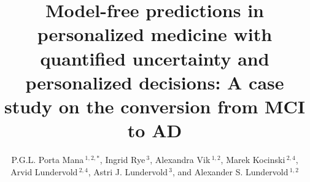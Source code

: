 \documentclass[utf8]{FrontiersinHarvard} %
\renewcommand*{\|}[1][]{\nonscript\:#1\vert\nonscript\:\mathopen{}}
\def\firstAuthorLast{Sample {et~al.}} %
\def\Authors{P.G.L. Porta Mana\,$^{1,2,*}$, Ingrid Rye\,$^{3}$, Alexandra Vik\,$^{1,2}$, Marek Kocinski\,$^{2,4}$, Arvid Lundervold\,$^{2,4}$, Astri J. Lundervold\,$^{3}$, and Alexander S. Lundervold\,$^{1,2}$}
\begin{document}
\onecolumn
{}

\title[Conversion from MCI to AD]{Model-free predictions in personalized medicine with quantified uncertainty and personalized decisions: A case study on the conversion from MCI to AD} 

\author[\firstAuthorLast ]{\Authors} %
\address{} %
\correspondance{} %

\extraAuth{}%


\maketitle
\end{document}
